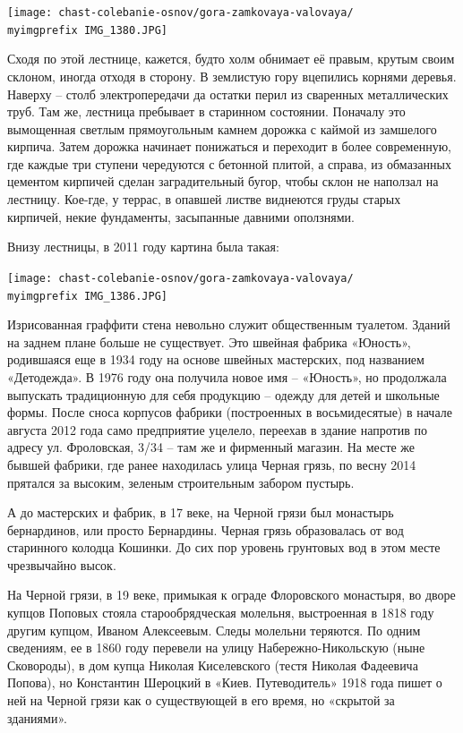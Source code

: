 \begin{center}
\texttt{[image: chast-colebanie-osnov/gora-zamkovaya-valovaya/\\myimgprefix IMG\_1380.JPG]}
\end{center}

Сходя по этой лестнице, кажется, будто холм обнимает её правым, крутым своим склоном, иногда отходя в сторону. В землистую гору вцепились корнями деревья. Наверху – столб электропередачи да остатки перил из сваренных металлических труб. Там же, лестница пребывает в старинном состоянии. Поначалу это вымощенная светлым прямоугольным камнем дорожка с каймой из замшелого кирпича. Затем дорожка начинает понижаться и переходит в более современную, где каждые три ступени чередуются с бетонной плитой, а справа, из обмазанных цементом кирпичей сделан заградительный бугор, чтобы склон не наползал на лестницу. Кое-где, у террас, в опавшей листве виднеются груды старых кирпичей, некие фундаменты, засыпанные давними оползнями.

Внизу лестницы, в 2011 году картина была такая:

\begin{center}
\texttt{[image: chast-colebanie-osnov/gora-zamkovaya-valovaya/\\myimgprefix IMG\_1386.JPG]}
\end{center}

Изрисованная граффити стена невольно служит общественным туалетом. Зданий на заднем плане больше не существует. Это швейная фабрика «Юность», родившаяся еще в 1934 году на основе швейных мастерских, под названием «Детодежда». В 1976 году она получила новое имя – «Юность», но продолжала выпускать традиционную для себя продукцию – одежду для детей и школьные формы. После сноса корпусов фабрики (построенных в восьмидесятые) в начале августа 2012 года само предприятие уцелело, переехав в здание напротив по адресу ул. Фроловская, 3/34 – там же и фирменный магазин. На месте же бывшей фабрики, где ранее находилась улица Черная грязь, по весну 2014 прятался за высоким, зеленым строительным забором пустырь.

А до мастерских и фабрик, в 17 веке, на Черной грязи был монастырь бернардинов, или просто Бернардины. Черная грязь образовалась от вод старинного колодца Кошинки. До сих пор уровень грунтовых вод в этом месте чрезвычайно высок. 

На Черной грязи, в 19 веке, примыкая к ограде Флоровского монастыря, во дворе купцов Поповых стояла старообрядческая молельня, выстроенная в 1818 году другим купцом, Иваном Алексеевым. Следы молельни теряются. По одним сведениям, ее в 1860 году перевели на улицу Набережно-Никольскую (ныне Сковороды), в дом купца Николая Киселевского (тестя Николая Фадеевича Попова), но Константин Шероцкий в «Киев. Путеводитель» 1918 года пишет о ней на Черной грязи как о существующей в его время, но «скрытой за зданиями».


